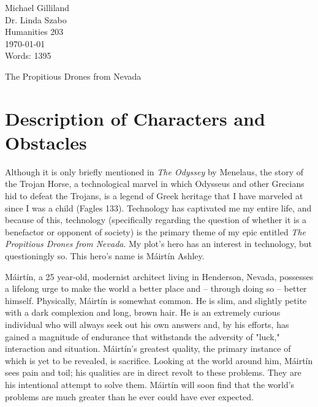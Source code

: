 \documentclass[12pt]{article}
\newcommand{\mc}{M\'airt\'in}
\newcommand{\mcs}{M\'airt\'in }
\begin{document}
\begin{flushleft}

Michael Gilliland \\
Dr. Linda Szabo \\
Humanities 203 \\
\today \\
Words: 1395 \\

\begin{center}
{\large The Propitious Drones from Nevada}
\end{center}

\setlength{\parindent}{0.5in} 


\section{Description of Characters and Obstacles}

\indent Although it is only briefly mentioned in \emph{The Odyssey} by Menelaus, the story of
the Trojan Horse, a technological marvel in which Odysseus and other Grecians hid to defeat the Trojans,
is a legend of Greek heritage that I have marveled at since I was a child (Fagles 133).
Technology has captivated me my entire life, and because of this, technology (specifically regarding the question of
whether it is a benefactor or opponent of society) is the primary theme of my epic entitled \emph{The Propitious
Drones from Nevada}. My plot's hero has an interest
in technology, but questioningly so. This hero's name is \mcs Ashley.

\mc, a 25 year-old, modernist architect living in Henderson, Nevada, possesses a lifelong urge
to make the world a better place and -- through doing so -- better himself. Physically, \mcs is somewhat common. 
He is slim, and slightly petite with a dark complexion and long, brown hair. He is an extremely curious individual
who will always seek out his own answers and, by his efforts, has gained a magnitude of endurance that withstands
the adversity of "luck," interaction and situation. \mc's greatest quality, the primary instance of which is yet to be 
revealed, is sacrifice. Looking at the world around him, \mcs sees pain and toil; his qualities are in direct revolt to these
problems. They are his intentional attempt to solve them. \mcs will soon find that the world's problems
are much greater than he ever could have ever expected.


\end{flushleft}
\end{document}
